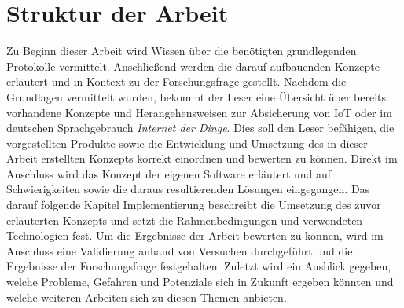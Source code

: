 \section{Struktur der Arbeit}
    Zu Beginn dieser Arbeit wird Wissen über die benötigten grundlegenden Protokolle vermittelt.
    Anschließend werden die darauf aufbauenden Konzepte erläutert und in Kontext zu der Forschungsfrage gestellt.
    Nachdem die Grundlagen vermittelt wurden, bekommt der Leser eine Übersicht über bereits vorhandene Konzepte und Herangehensweisen zur Absicherung von \ac{IoT} oder im deutschen Sprachgebrauch \emph{Internet der Dinge}. 
    Dies soll den Leser befähigen, die vorgestellten Produkte sowie die Entwicklung und Umsetzung des in dieser Arbeit erstellten Konzepts korrekt einordnen und bewerten zu können.
    Direkt im Anschluss wird das Konzept der eigenen Software erläutert und auf Schwierigkeiten sowie die daraus resultierenden Lösungen eingegangen. Das darauf folgende Kapitel \glqq Implementierung\grqq{} beschreibt die Umsetzung des zuvor erläuterten Konzepts und setzt die Rahmenbedingungen und verwendeten Technologien fest. Um die Ergebnisse der Arbeit bewerten zu können, wird im Anschluss eine Validierung anhand von Versuchen durchgeführt und die Ergebnisse der Forschungsfrage festgehalten. Zuletzt wird ein Ausblick gegeben, welche Probleme, Gefahren und Potenziale sich in Zukunft ergeben könnten und welche weiteren Arbeiten sich zu diesen Themen anbieten.

